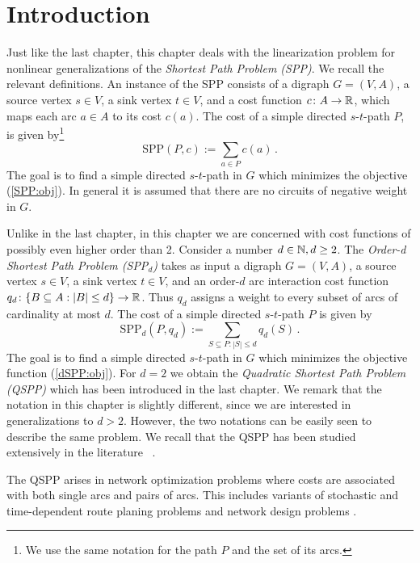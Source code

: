 \section{Introduction}\label{intro:sec}

Just like the last chapter, this chapter deals with the linearization problem for 
nonlinear
generalizations of the  \emph{Shortest Path Problem (SPP)}. We recall the relevant definitions.
An instance of the SPP  consists  of a digraph $G = (V, A)$,  a source vertex $s \in V$, a sink vertex $t \in V$, and a
cost function $c\colon A\to \mathbb{R}$, which maps each arc $a\in A$ to its cost
$c(a)$.  The cost of a simple directed $s$-$t$-path $P$, 
is given by\footnote{We use the same  notation for the path $P$ and the set of its arcs.}
\begin{equation}\label{SPP:obj}  \text{SPP}(P,c):=\sum_{a\in P} c(a)\, .  \end{equation}
The goal  is to find a simple directed 
$s$-$t$-path in $G$ which minimizes the objective 
(\ref{SPP:obj}).
In general it is assumed that 
there are no circuits of negative weight in $G$. 


Unlike in the last chapter, in this chapter we are concerned with cost functions of possibly even higher order than 2. Consider a number $d\in \mathbb{N}, d \geq 2$.  The \emph{Order-d Shortest Path Problem
  (SPP$_d$)}
 takes as input a  digraph $G = (V, A)$,  
  a source vertex $s \in V$, a sink vertex $t \in V$, and an order-$d$ arc interaction 
cost  function $q_d\colon \{ B \subseteq A : |B| \leq d \}
\to \mathbb{R}$. Thus $q_d$ assigns a  weight to every subset of
arcs of cardinality at most $d$.
 The cost of a simple directed $s$-$t$-path $P$ 
is given by
\begin{equation}\label{dSPP:obj}
  \text{SPP}_d(P,q_d):=\sum_{S\subseteq P \colon |S|\le d} q_d(S)\, .\end{equation}
The goal is to find  
a simple directed 
$s$-$t$-path in $G$ which minimizes the objective function (\ref{dSPP:obj}).
For $d=2$ we
obtain the   \emph{Quadratic  Shortest Path Problem (QSPP)} which has been introduced in the last chapter. We remark that the notation in this chapter is slightly different, since we are interested in generalizations to $d > 2$. However, the two notations can be easily seen to describe the same problem. We recall that the QSPP has been studied extensively in the literature
~\cite{cela2021linearizable,huSo2018,huSo2020,rostami2018}. 


\smallskip

The QSPP arises 
in network optimization  problems where costs are associated with both single arcs and pairs of arcs.
This includes 
variants of stochastic and time-dependent route planing  problems  
\cite{nie2009reliable,sen2001mean,sivakumar1994variance}
and network design problems 
\cite{murakami1997restoration,gamvros2006satellite}. 

